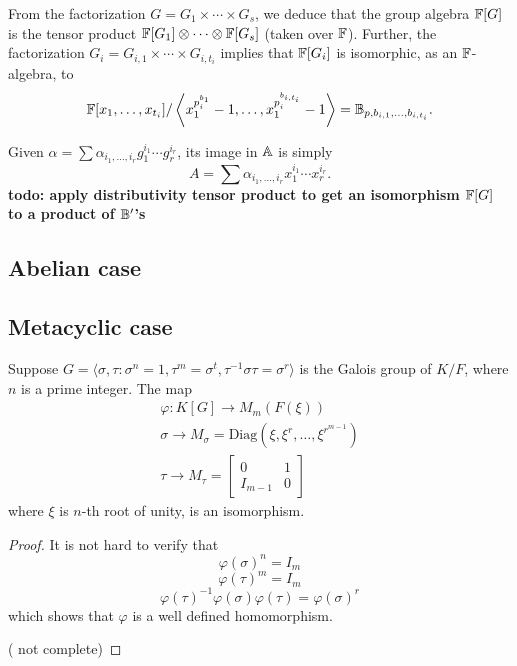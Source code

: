 From the factorization $G = G_1 \times \cdots \times G_s$, we deduce
that the group algebra $\mathbb{F}[G]$ is the tensor product $\mathbb{F}[G_1]
\otimes \cdots \otimes \mathbb{F}[G_s]$ (taken over $\mathbb{F}$). Further, the 
factorization $G_i = G_{i,1} \times \cdots \times G_{i,t_i}$
implies that $\mathbb{F}[G_i]$ is isomorphic, as an $\mathbb{F}$-algebra, to
$$\mathbb{F}[x_{1},\dots,x_{t_i}]/\left \langle x_{1}^{p_i^{b_{1}}}-1,\dots,x_{1}^{p_i^{b_{i,t_i}}}-1\right\rangle
=\mathbb{B}_{p,b_{i,1},\dots,b_{i,t_i}}.$$


Given $\alpha = \sum \alpha_{i_1,\dots,i_r} g_1^{i_1}\cdots
g_r^{i_r}$, its image in $\mathbb{A}$ is simply 
$$A= \sum
\alpha_{i_1,\dots,i_r} x_1^{i_1}\cdots x_r^{i_r}.$$
{\bf todo: apply distributivity tensor product to get an isomorphism
$\mathbb{F}[G]$ to a product of $\mathbb{B}'$'s}








\subsection{Abelian case}

\subsection{Metacyclic case}

\begin{proposition}
Suppose $G = \langle \sigma , \tau : \sigma^n = 1, \tau^m = \sigma^t, \tau^{-1} \sigma \tau = \sigma^r \rangle$ is the Galois group 
of $K/F$, where $n$ is a prime integer. The map 
\begin{equation}
\begin{split}
\varphi: K[G] \longrightarrow M_{m}(F(\xi))\\
\sigma \longrightarrow M_{\sigma} = \mathrm{Diag}(\xi, \xi^r, \ldots , \xi^{r^{m-1}})\\
\tau \longrightarrow 
M_{\tau} = \left[ \begin{array}{l|l}
0 & 1\\
\hline
I_{m-1}& 0
\end{array} \right] 
\end{split}
\end{equation}
where $\xi$ is $n$-th root of unity, is an isomorphism.
\end{proposition}

\begin{proof}
It is not hard to verify that 
$$\varphi(\sigma)^n = I_m$$
$$\varphi(\tau)^m = I_m$$
$$\varphi(\tau)^{-1}\varphi(\sigma) \varphi(\tau) = \varphi(\sigma)^r$$
which shows that $\varphi$ is a well defined homomorphism.



({\color{red} not complete})
\end{proof}

